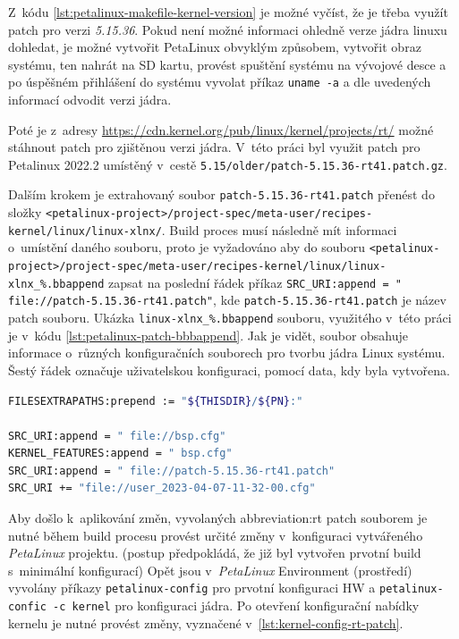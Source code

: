 \documentclass[a4paper, twoside, 11pt]{article}
\begin{document}
				Z~kódu \ref{lst:petalinux-makefile-kernel-version} je možné vyčíst, že je třeba využít patch pro verzi \textit{5.15.36}. Pokud není možné informaci ohledně verze jádra linuxu dohledat, je možné vytvořit PetaLinux obvyklým způsobem, vytvořit obraz systému, ten nahrát na SD kartu, provést spuštění systému na vývojové desce a po úspěšném přihlášení do systému vyvolat příkaz \texttt{uname -a} a dle uvedených informací odvodit verzi jádra.\par
				Poté je z~adresy \href{https://cdn.kernel.org/pub/linux/kernel/projects/rt/}{\textcolor{ctublue}{https://cdn.kernel.org/pub/linux/kernel/projects/rt/}} možné stáhnout patch pro zjištěnou verzi jádra. V~této práci byl využit patch pro Petalinux 2022.2 umístěný v~cestě \texttt{5.15/older/patch-5.15.36-rt41.patch.gz}.\par
				Dalším krokem je extrahovaný soubor \texttt{patch-5.15.36-rt41.patch} přenést do složky \texttt{<petalinux-project>/project-spec/meta-user/recipes-kernel/linux/linux-xlnx/}. Build proces musí následně mít informaci o~umístění daného souboru, proto je vyžadováno aby do souboru \texttt{<petalinux-project>/project-spec/meta-user/recipes-kernel/linux/linux-xlnx\_\%.bbappend} zapsat na poslední řádek příkaz \texttt{SRC\_URI:append = " file://patch-5.15.36-rt41.patch"}, kde \texttt{patch-5.15.36-rt41.patch} je název patch souboru. Ukázka \texttt{linux-xlnx\_\%.bbappend} souboru, využitého v~této práci je v~kódu \ref{lst:petalinux-patch-bbbappend}. Jak je vidět, soubor obsahuje informace o~různých konfiguračních souborech pro tvorbu jádra Linux systému. Šestý řádek označuje uživatelskou konfiguraci, pomocí data, kdy byla vytvořena.

				\begin{lstlisting}[language={sh}, caption={Ukázka konfiguračního souboru pro aplikování Linux patch souboru.}, label= {lst:petalinux-patch-bbbappend}]
FILESEXTRAPATHS:prepend := "${THISDIR}/${PN}:"

SRC_URI:append = " file://bsp.cfg"
KERNEL_FEATURES:append = " bsp.cfg"
SRC_URI:append = " file://patch-5.15.36-rt41.patch"
SRC_URI += "file://user_2023-04-07-11-32-00.cfg"\end{lstlisting}

				Aby došlo k~aplikování změn, vyvolaných \gls{abbreviation:rt} patch souborem je nutné během build procesu provést určité změny v~konfiguraci vytvářeného \textit{PetaLinux} projektu. (postup předpokládá, že již byl vytvořen prvotní build s~minimální konfigurací) Opět jsou v~\textit{PetaLinux} Environment (prostředí) vyvolány příkazy \texttt{petalinux-config} pro prvotní konfiguraci HW a \texttt{petalinux-confic -c kernel} pro konfiguraci jádra. Po otevření konfigurační nabídky kernelu je nutné provést změny, vyznačené v~\ref{lst:kernel-config-rt-patch}.
\end{document}
